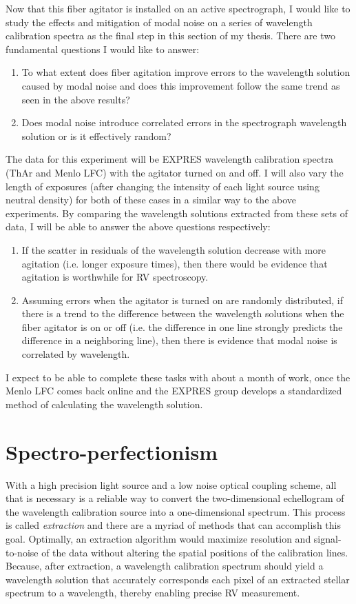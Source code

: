\documentclass[11pt]{article}
\begin{document}
Now that this fiber agitator is installed on an active spectrograph, I would like to study the effects and mitigation of modal noise on a series of wavelength calibration spectra as the final step in this section of my thesis. There are two fundamental questions I would like to answer:
\begin{enumerate}
    \item To what extent does fiber agitation improve errors to the wavelength solution caused by modal noise and does this improvement follow the same trend as seen in the above results?
    \item Does modal noise introduce correlated errors in the spectrograph wavelength solution or is it effectively random?
\end{enumerate}
The data for this experiment will be EXPRES wavelength calibration spectra (ThAr and Menlo LFC) with the agitator turned on and off. I will also vary the length of exposures (after changing the intensity of each light source using neutral density) for both of these cases in a similar way to the above experiments. By comparing the wavelength solutions extracted from these sets of data, I will be able to answer the above questions respectively:
\begin{enumerate}
    \item If the scatter in residuals of the wavelength solution decrease with more agitation (i.e. longer exposure times), then there would be evidence that agitation is worthwhile for RV spectroscopy.
    \item Assuming errors when the agitator is turned on are randomly distributed, if there is a trend to the difference between the wavelength solutions when the fiber agitator is on or off (i.e. the difference in one line strongly predicts the difference in a neighboring line), then there is evidence that modal noise is correlated by wavelength.
\end{enumerate}
I expect to be able to complete these tasks with about a month of work, once the Menlo LFC comes back online and the EXPRES group develops a standardized method of calculating the wavelength solution.

\section{Spectro-perfectionism}
\label{sec:spec_perf}

With a high precision light source and a low noise optical coupling scheme, all that is necessary is a reliable way to convert the two-dimensional echellogram of the wavelength calibration source into a one-dimensional spectrum. This process is called \textit{extraction} and there are a myriad of methods that can accomplish this goal. Optimally, an extraction algorithm would maximize resolution and signal-to-noise of the data without altering the spatial positions of the calibration lines. Because, after extraction, a wavelength calibration spectrum should yield a wavelength solution that accurately corresponds each pixel of an extracted stellar spectrum to a wavelength, thereby enabling precise RV measurement.
\end{document}
